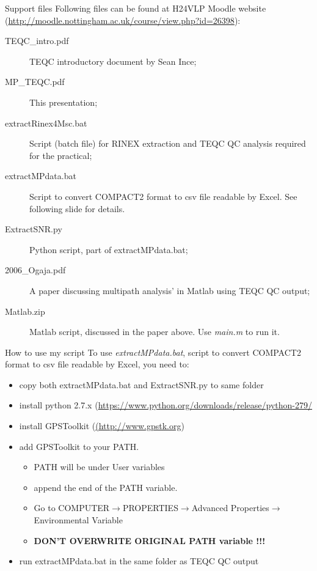 \documentclass[11pt]{beamer}
\begin{document}
	\begin{frame}{Support files}
		Following files can be found at H24VLP Moodle website (\url{http://moodle.nottingham.ac.uk/course/view.php?id=26398}):
		\begin{description}
			\item[TEQC\_intro.pdf] TEQC introductory document by Sean Ince;
			\item[MP\_TEQC.pdf] This presentation;
			\item[extractRinex4Msc.bat] Script (batch file) for RINEX extraction and TEQC QC analysis required for the practical;
			\item[extractMPdata.bat] Script to convert COMPACT2 format to csv file readable by Excel. See following slide for details.
			\item[ExtractSNR.py] Python script, part of extractMPdata.bat;
			\item[2006\_Ogaja.pdf] A paper discussing multipath analysis' in Matlab using TEQC QC output;
			\item[Matlab.zip] Matlab script, discussed in the paper above. Use \textit{main.m} to run it.
		\end{description}
		
	\end{frame}	


	\begin{frame}[allowframebreaks]{How to use my script}
		To use \textit{extractMPdata.bat}, script to convert COMPACT2 format to csv file readable by Excel, you need to:
		\begin{itemize}
			\item copy both extractMPdata.bat and ExtractSNR.py to same folder
			\item install python 2.7.x (\url{https://www.python.org/downloads/release/python-279/}
			\item install GPSToolkit (\url{(http://www.gpstk.org})
			\item add GPSToolkit to your PATH. 
				\begin{itemize}
					\item PATH will be under User variables
					\item append  the end of the PATH variable.
					\item Go to COMPUTER$\rightarrow$PROPERTIES$\rightarrow$Advanced Properties$\rightarrow$Environmental Variable
					\item \textbf{DON'T OVERWRITE ORIGINAL PATH variable !!!}
				\end{itemize}
			\item run extractMPdata.bat in the same folder as TEQC QC output
		\end{itemize}
		
	\end{frame}	
	
\end{document}
